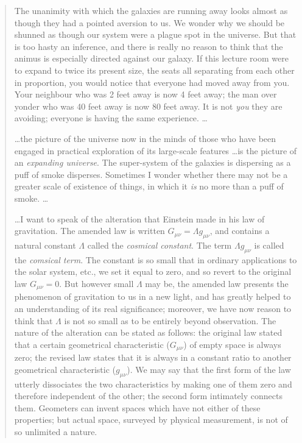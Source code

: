 \begin{quotation}
The unanimity with which the galaxies are running away looks almost as though they had a pointed aversion to us. We wonder why we should be shunned as though our system were a plague spot in the universe. But that is too hasty an inference, and there is really no reason to think that the animus is especially directed against our galaxy. If this lecture room were to expand to twice its present size, the seats all separating from each other in proportion, you would notice that everyone had moved away from you. Your neighbour who was 2 feet away is now 4 feet away; the man over yonder who was 40 feet away is now 80 feet away. It is not \textit{you} they are avoiding; everyone is having the same experience. \ldots

\ldots the picture of the universe now in the minds of those who have been engaged in practical exploration of its large-scale features \ldots is the picture of an \textit{expanding universe}. The super-system of the galaxies is dispersing as a puff of smoke disperses. Sometimes I wonder whether there may not be a greater scale of existence of things, in which it \textit{is} no more than a puff of smoke. \ldots

\ldots I want to speak of the alteration that Einstein made in his law of gravitation. The amended law is written $G_{\mu\nu}=\Lambda{g_{\mu\nu}}$, and contains a natural constant $\Lambda$ called the \textit{cosmical constant}. The term $\Lambda{g_{\mu\nu}}$ is called the \textit{comsical term}. The constant is so small that in ordinary applications to the solar system, etc., we set it equal to zero, and so revert to the original law $G_{\mu\nu}=0$. But however small $\Lambda$ may be, the amended law presents the phenomenon of gravitation to us in a new light, and has greatly helped to an understanding of its real significance; moreover, we have now reason to think that $\Lambda$ is not so small as to be entirely beyond observation. The nature of the alteration can be stated as follows: the original law stated that a certain geometrical characteristic ($G_{\mu\nu}$) of empty space is always zero; the revised law states that it is always in a constant ratio to another geometrical characteristic ($g_{\mu\nu}$). We may say that the first form of the law utterly dissociates the two characteristics by making one of them zero and therefore independent of the other; the second form intimately connects them. Geometers can invent spaces which have not either of these properties; but actual space, surveyed by physical measurement, is not of so unlimited a nature.


\end{quotation}
